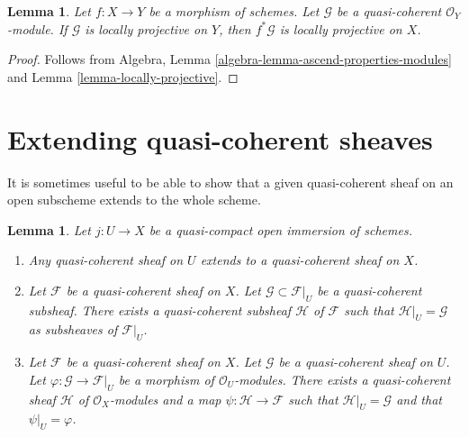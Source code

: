 \documentclass{stacks-project}
\theoremstyle{plain}
\newtheorem{lemma}[subsection]{Lemma}
\theoremstyle{definition}
\theoremstyle{remark}
\numberwithin{equation}{subsection}
\begin{document}
\begin{lemma}
\label{lemma-locally-projective-pullback}
Let $f : X \to Y$ be a morphism of schemes.
Let $\mathcal{G}$ be a quasi-coherent $\mathcal{O}_Y$-module.
If $\mathcal{G}$ is locally projective on $Y$, then $f^*\mathcal{G}$
is locally projective on $X$.
\end{lemma}

\begin{proof}
Follows from
Algebra, Lemma \ref{algebra-lemma-ascend-properties-modules}
and Lemma \ref{lemma-locally-projective}.
\end{proof}






\section{Extending quasi-coherent sheaves}
\label{section-extending-quasi-coherent-sheaves}

\noindent
It is sometimes useful to be able to show that a given quasi-coherent
sheaf on an open subscheme extends to the whole scheme.

\begin{lemma}
\label{lemma-extend-trivial}
Let $j : U \to X$ be a quasi-compact open immersion of schemes.
\begin{enumerate}
\item Any quasi-coherent sheaf on $U$ extends to a quasi-coherent
sheaf on $X$.
\item Let $\mathcal{F}$ be a quasi-coherent sheaf on $X$.
Let $\mathcal{G} \subset \mathcal{F}|_U$ be a quasi-coherent
subsheaf. There exists a quasi-coherent subsheaf $\mathcal{H}$ of
$\mathcal{F}$ such that $\mathcal{H}|_U = \mathcal{G}$
as subsheaves of $\mathcal{F}|_U$.
\item Let $\mathcal{F}$ be a quasi-coherent sheaf on $X$.
Let $\mathcal{G}$ be a quasi-coherent sheaf on $U$.
Let $\varphi : \mathcal{G} \to \mathcal{F}|_U$ be a morphism
of $\mathcal{O}_U$-modules. There exists a quasi-coherent sheaf $\mathcal{H}$
of $\mathcal{O}_X$-modules and a map $\psi : \mathcal{H} \to \mathcal{F}$
such that $\mathcal{H}|_U = \mathcal{G}$ and that
$\psi|_U = \varphi$.
\end{enumerate}
\end{lemma}
\end{document}
